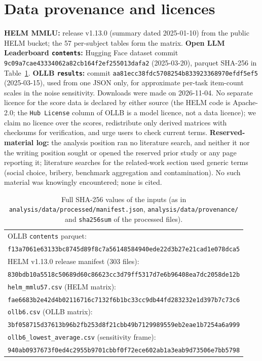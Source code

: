 \section{Data provenance and licences}
\label{app:data}
\textbf{HELM MMLU:} release v1.13.0 (summary dated 2025-01-10) from the public HELM bucket; the 57 per-subject tables form the matrix. \textbf{Open LLM Leaderboard \texttt{contents}:} Hugging Face dataset commit \texttt{9c09a7cae43334062a82cb164f2ef255013dafa2} (2025-03-20), parquet SHA-256 in Table~\ref{tab:sha}. \textbf{OLLB \texttt{results}:} commit \texttt{aa81ecc38fdc5708254b833923368970efdf5ef5} (2025-03-15), used from one JSON only, for approximate per-task item-count scales in the noise sensitivity. Downloads were made on 2026-11-04. No separate licence for the score data is declared by either source (the HELM code is Apache-2.0; the \texttt{Hub License} column of OLLB is a model licence, not a data licence); we claim no licence over the scores, redistribute only derived matrices with checksums for verification, and urge users to check current terms. \textbf{Reserved-material log:} the analysis position ran no literature search, and neither it nor the writing position sought or opened the reserved prior study or any page reporting it; literature searches for the related-work section used generic terms (social choice, bribery, benchmark aggregation and contamination). No such material was knowingly encountered; none is cited.
\begin{table}[h]
\caption{Full SHA-256 values of the inputs (as in \texttt{analysis/data/processed/manifest.json}, \texttt{analysis/data/provenance/} and \texttt{sha256sum} of the processed files).}
\label{tab:sha}
\centering\footnotesize
\begin{tabular}{@{}l@{}}
OLLB \texttt{contents} parquet:\\\texttt{f13a7061e63133bc8745d89f8c7a56148584940ede22d3b27e21cad1e078dca5}\\
HELM v1.13.0 release manifest (303 files):\\\texttt{830bdb10a5518c50689d60c86623cc3d79ff5317d7e6b96408ea7dc2058de12b}\\
\texttt{helm\_mmlu57.csv} (HELM matrix):\\\texttt{fae6683b2e42d4b02116716c7132f6b1bc33cc9db44fd283232e1d397b7c73c6}\\
\texttt{ollb6.csv} (OLLB matrix):\\\texttt{3bf058715d37613b96b2fb253d8f21cbb49b7129989559eb2eae1b7254a6a999}\\
\texttt{ollb6\_lowest\_average.csv} (sensitivity frame):\\\texttt{940ab0937673f0ed4c2955b9701cbbf0f72ece602ab1a3eab9d73506e7bb5798}\\
\end{tabular}
\end{table}

